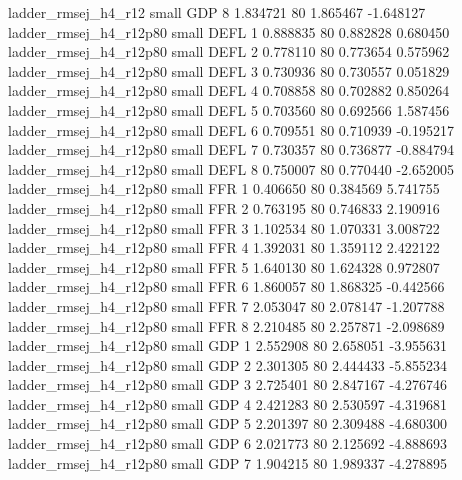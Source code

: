      ladder_rmsej_h4_r12      small      GDP                 8 1.834721 80       1.865467          -1.648127
  ladder_rmsej_h4_r12p80      small     DEFL                 1 0.888835 80       0.882828           0.680450
  ladder_rmsej_h4_r12p80      small     DEFL                 2 0.778110 80       0.773654           0.575962
  ladder_rmsej_h4_r12p80      small     DEFL                 3 0.730936 80       0.730557           0.051829
  ladder_rmsej_h4_r12p80      small     DEFL                 4 0.708858 80       0.702882           0.850264
  ladder_rmsej_h4_r12p80      small     DEFL                 5 0.703560 80       0.692566           1.587456
  ladder_rmsej_h4_r12p80      small     DEFL                 6 0.709551 80       0.710939          -0.195217
  ladder_rmsej_h4_r12p80      small     DEFL                 7 0.730357 80       0.736877          -0.884794
  ladder_rmsej_h4_r12p80      small     DEFL                 8 0.750007 80       0.770440          -2.652005
  ladder_rmsej_h4_r12p80      small      FFR                 1 0.406650 80       0.384569           5.741755
  ladder_rmsej_h4_r12p80      small      FFR                 2 0.763195 80       0.746833           2.190916
  ladder_rmsej_h4_r12p80      small      FFR                 3 1.102534 80       1.070331           3.008722
  ladder_rmsej_h4_r12p80      small      FFR                 4 1.392031 80       1.359112           2.422122
  ladder_rmsej_h4_r12p80      small      FFR                 5 1.640130 80       1.624328           0.972807
  ladder_rmsej_h4_r12p80      small      FFR                 6 1.860057 80       1.868325          -0.442566
  ladder_rmsej_h4_r12p80      small      FFR                 7 2.053047 80       2.078147          -1.207788
  ladder_rmsej_h4_r12p80      small      FFR                 8 2.210485 80       2.257871          -2.098689
  ladder_rmsej_h4_r12p80      small      GDP                 1 2.552908 80       2.658051          -3.955631
  ladder_rmsej_h4_r12p80      small      GDP                 2 2.301305 80       2.444433          -5.855234
  ladder_rmsej_h4_r12p80      small      GDP                 3 2.725401 80       2.847167          -4.276746
  ladder_rmsej_h4_r12p80      small      GDP                 4 2.421283 80       2.530597          -4.319681
  ladder_rmsej_h4_r12p80      small      GDP                 5 2.201397 80       2.309488          -4.680300
  ladder_rmsej_h4_r12p80      small      GDP                 6 2.021773 80       2.125692          -4.888693
  ladder_rmsej_h4_r12p80      small      GDP                 7 1.904215 80       1.989337          -4.278895
